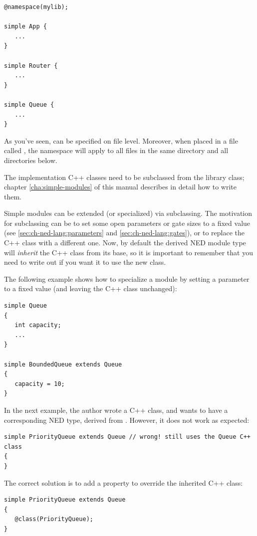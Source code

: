 \begin{Verbatim}
@namespace(mylib);

simple App {
   ...
}

simple Router {
   ...
}

simple Queue {
   ...
}
\end{Verbatim}

As you've seen,  can be specified on file level. Moreover,
when placed in a file called , the namespace will apply to
all files in the same directory and all directories below.

The implementation C++ classes need to be subclassed from the
 library class; chapter \ref{cha:simple-modules} of
this manual describes in detail how to write them.

Simple modules can be extended (or specialized) via subclassing. The
motivation for subclassing can be to set some open parameters or gate sizes
to a fixed value (see \ref{sec:ch-ned-lang:parameters} and
\ref{sec:ch-ned-lang:gates}), or to replace the C++ class with a different
one. Now, by default the derived NED module type will \textit{inherit} the
C++ class from its base, so it is important to remember that you need to
write out  if you want it to use the new class.

The following example shows how to specialize a module by setting a parameter
to a fixed value (and leaving the C++ class unchanged):

\begin{Verbatim}
simple Queue
{
   int capacity;
   ...
}

simple BoundedQueue extends Queue
{
   capacity = 10;
}
\end{Verbatim}

In the next example, the author wrote a  C++ class, and
wants to have a corresponding NED type, derived from . However,
it does not work as expected:

\begin{Verbatim}
simple PriorityQueue extends Queue // wrong! still uses the Queue C++ class
{
}
\end{Verbatim}

The correct solution is to add a  property to override the
inherited C++ class:

\begin{Verbatim}
simple PriorityQueue extends Queue
{
   @class(PriorityQueue);
}
\end{Verbatim}

